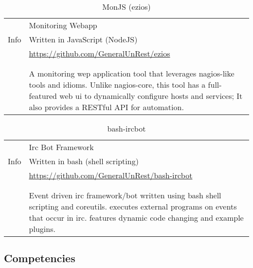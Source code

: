 \documentclass[9pt,letterpaper,]{article}
\begin{document}
\begin{table}[!h]
\centering
    \caption{MonJS (ezios)}
    \begin{tabularx}{\textwidth}{r|X}
        \multirow{3}{*}{Info} & Monitoring Webapp \\
                              & Written in JavaScript (NodeJS) \\
                              & \href{https://github.com/GeneralUnRest/ezios}{https://github.com/GeneralUnRest/ezios} \\
        & \\
        \begin{tabular}{@{}l@{}}
            Description \\
        \end{tabular}
        & A monitoring wep application tool that leverages nagios-like 
        tools and idioms. Unlike nagios-core, this tool has a full-featured 
        web ui to dynamically configure hosts and services; It also provides
        a RESTful API for automation.
    \end{tabularx}
\end{table}

\begin{table}[!h]
\centering
    \caption{bash-ircbot}
    \begin{tabularx}{\textwidth}{r|X}
        \multirow{3}{*}{Info} & Irc Bot Framework \\
                              & Written in bash (shell scripting) \\
                              & \href{https://github.com/GeneralUnRest/bash-ircbot}{https://github.com/GeneralUnRest/bash-ircbot} \\
        & \\
        \begin{tabular}{@{}l@{}}
            Description \\
        \end{tabular}
        & Event driven irc framework/bot 
        written using bash shell scripting and coreutils.
        executes external programs on events that occur in irc.
        features dynamic code changing and example plugins. 
    \end{tabularx}
\end{table}

\subsection{Competencies}\label{competencies}
\end{document}
